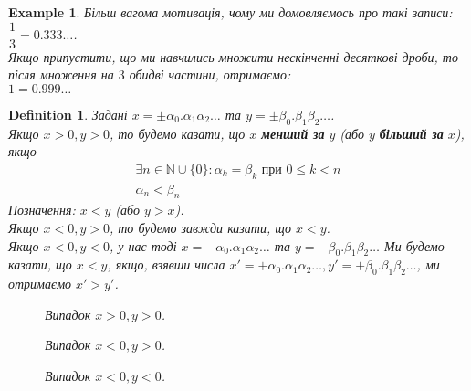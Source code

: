 \documentclass[a4paper, 14pt]{article}
\theoremstyle{theoremdd}
\theoremstyle{theoremdd}
\newtheorem{definition}[theorem]{Definition}
\theoremstyle{theoremdd}
\theoremstyle{theoremdd}
\newtheorem{example}[theorem]{Example}
\theoremstyle{theoremdd}
\theoremstyle{theoremdd}
\theoremstyle{theoremdd}
\theoremstyle{theoremdd}
\begin{document}
	\begin{example}
	Більш вагома мотивація, чому ми домовляємось про такі записи:\\
	$\dfrac{1}{3} = 0.333 \dots$.\\
	Якщо припустити, що ми навчились множити нескінченні десяткові дроби, то після множення на $3$ обидві частини, отримаємо:\\
	$1 = 0.999 \dots$
	\end{example}
	
	\begin{definition}
	Задані $x = \pm\alpha_0.\alpha_1 \alpha_2 \dots$ та $y = \pm\beta_0.\beta_1 \beta_2 \dots$.\\
	Якщо $x > 0, y > 0$, то будемо казати, що $x$ \textbf{менший за} $y$ (або $y$ \textbf{більший за} $x$), якщо
	\begin{align*}
	\exists n \in \mathbb{N} \cup \{0\}: \alpha_k = \beta_k \text{ при } 0 \leq k < n \\
	\alpha_n < \beta_n
	\end{align*}
	Позначення: $x < y$ (або $y > x$).\\
	Якщо $x < 0, y > 0$, то будемо завжди казати, що $x < y$.\\
	Якщо $x < 0, y < 0$, у нас тоді $x = -\alpha_0.\alpha_1 \alpha_2 \dots$ та $y = -\beta_0.\beta_1 \beta_2 \dots$ Ми будемо казати, що $x < y$, якщо, взявши числа $x' = +\alpha_0.\alpha_1 \alpha_2 \dots, y' = +\beta_0.\beta_1 \beta_2 \dots$, ми отримаємо $x' > y'$.
	\begin{figure}[H]
	\centering
	\caption*{Випадок $x > 0, y > 0$.}
	\end{figure}
	\begin{figure}[H]
	\centering
	\caption*{Випадок $x < 0, y > 0$.}
	\end{figure}
	\begin{figure}[H]
	\centering
	\caption*{Випадок $x < 0, y < 0$.}
	\end{figure}
	\end{definition}
	
\end{document}
